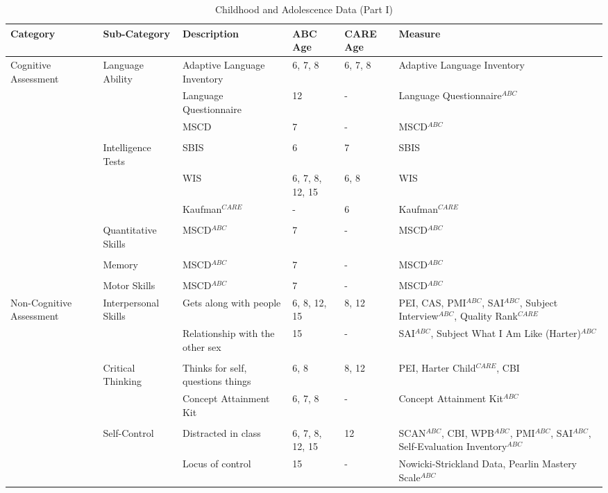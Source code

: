 \begin{sidewaystable}[H]
\begin{threeparttable}
\small
\caption{Childhood and Adolescence Data (Part I)} \label{tab:youthvars_1}
\centering
\tiny	
\begin{tabular}{L{3.5cm} C{3.5cm} C{5cm} C{1.5cm} C{1.5cm} C{6cm}}
\toprule
\textbf{Category}	&	\textbf{Sub-Category}	&	\textbf{Description}	&	\textbf{ABC Age}  	&  \textbf{CARE Age}  & 	\textbf{Measure}	\\ \midrule
Cognitive Assessment	&	Language Ability	&	Adaptive Language Inventory	&	6, 7, 8	&	6, 7, 8	&	Adaptive Language Inventory	\\
	&		&	Language Questionnaire	&	12	&	- 	&	Language Questionnaire$^{ABC}$	\\
	&		&	MSCD 	&	7	&	- 	&	MSCD$^{ABC}$	\\
	&	\\
	&	Intelligence Tests	&	SBIS	 &	6	&	7	&	SBIS	\\
	&		&	 WIS	&	6, 7, 8, 12, 15	&	6, 8	&	WIS	\\
	&		& Kaufman$^{CARE}$ & 	-	& 6 & Kaufman$^{CARE}$ \\
	&	\\
	&	Quantitative Skills	&	MSCD$^{ABC}$ 	&	7	&	-	&	MSCD$^{ABC}$ 	\\
	&	\\
	&	Memory	&	MSCD$^{ABC}$ 	&	7	&	-	&	MSCD$^{ABC}$	\\
	&	\\
	&	Motor Skills	&	MSCD$^{ABC}$ 	&	7	&	-	&	MSCD$^{ABC}$	\\ \midrule
Non-Cognitive Assessment	&	Interpersonal Skills	&	Gets along with people	&	6, 8, 12, 15	& 	8, 12	&	PEI, CAS, PMI$^{ABC}$, SAI$^{ABC}$, Subject Interview$^{ABC}$, Quality Rank$^{CARE}$	\\
	&		&	Relationship with the other sex	&	15	&	- 	&	 SAI$^{ABC}$, Subject What I Am Like (Harter)$^{ABC}$	\\
	&	\\
	&	Critical Thinking	&	Thinks for self, questions things	&	6, 8	 &	8, 12	&	PEI, Harter Child$^{CARE}$, CBI	\\
	&		&	Concept Attainment Kit	&	6, 7, 8	&	- 	&	Concept Attainment Kit$^{ABC}$	\\
	&	\\
	&	Self-Control	&	Distracted in class	&	6, 7, 8, 12, 15	&	12	&	SCAN$^{ABC}$, CBI, WPB$^{ABC}$, PMI$^{ABC}$, SAI$^{ABC}$, Self-Evaluation Inventory$^{ABC}$	\\
	&		&	Locus of control	&	15	&	- 	&	Nowicki-Strickland Data, Pearlin Mastery Scale$^{ABC}$	\\

\end{tabular}
\end{threeparttable}
\end{sidewaystable}
